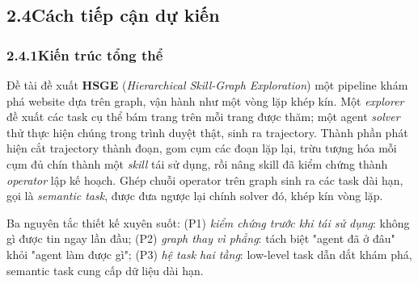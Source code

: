 \subsection*{2.4\quad Cách tiếp cận dự kiến}

\subsubsection*{2.4.1\quad Kiến trúc tổng thể}

Đề tài đề xuất \textbf{HSGE} (\textit{Hierarchical Skill-Graph Exploration})
một pipeline khám phá website dựa trên graph, vận hành như một vòng lặp
khép kín. Một \emph{explorer} đề xuất các task cụ thể bám trang trên mỗi trang
được thăm; một agent \emph{solver} thử thực hiện chúng trong trình duyệt thật,
sinh ra trajectory. Thành phần phát hiện cắt trajectory thành đoạn, gom cụm
các đoạn lặp lại, trừu tượng hóa mỗi cụm đủ chín thành một \emph{skill} tái sử
dụng, rồi nâng skill đã kiểm chứng thành \emph{operator} lập kế hoạch. Ghép
chuỗi operator trên graph sinh ra các task dài hạn, gọi là \emph{semantic task},
được đưa ngược lại chính solver đó, khép kín vòng lặp.

Ba nguyên tắc thiết kế xuyên suốt: (P1) \emph{kiểm chứng trước khi tái sử
dụng}: không gì được tin ngay lần đầu; (P2) \emph{graph thay vì phẳng}:
tách biệt "agent đã ở đâu" khỏi "agent làm được gì"; (P3) \emph{hệ task hai
tầng}: low-level task dẫn dắt khám phá, semantic task cung cấp dữ liệu dài
hạn.

